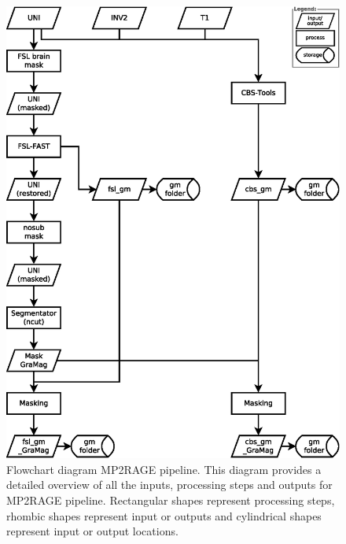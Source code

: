 \begin{figure}[htbp!]
\centering
\includegraphics[width=\textwidth]{figures/chapter_02_SI/figure_S6.eps}
\caption{Flowchart diagram MP2RAGE pipeline. This diagram provides a detailed overview of all the inputs, processing steps and outputs for MP2RAGE pipeline. Rectangular shapes represent processing steps, rhombic shapes represent input or outputs and cylindrical shapes represent input or output locations.}
\label{fig:S06_Fig}
\end{figure}

